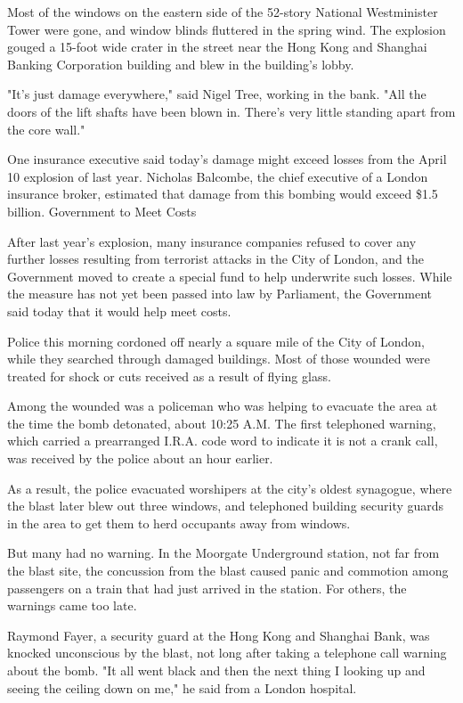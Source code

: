 Most of the windows on the eastern side of the 52-story National
Westminister Tower were gone, and window blinds fluttered in the spring
wind. The explosion gouged a 15-foot wide crater in the street near the
Hong Kong and Shanghai Banking Corporation building and blew in the
building's lobby.

"It's just damage everywhere," said Nigel Tree, working in the bank.
"All the doors of the lift shafts have been blown in. There's very
little standing apart from the core wall."

One insurance executive said today's damage might exceed losses from the
April 10 explosion of last year. Nicholas Balcombe, the chief executive
of a London insurance broker, estimated that damage from this bombing
would exceed \$1.5 billion. Government to Meet Costs

After last year's explosion, many insurance companies refused to cover
any further losses resulting from terrorist attacks in the City of
London, and the Government moved to create a special fund to help
underwrite such losses. While the measure has not yet been passed into
law by Parliament, the Government said today that it would help meet
costs.

Police this morning cordoned off nearly a square mile of the City of
London, while they searched through damaged buildings. Most of those
wounded were treated for shock or cuts received as a result of flying
glass.

Among the wounded was a policeman who was helping to evacuate the area
at the time the bomb detonated, about 10:25 A.M. The first telephoned
warning, which carried a prearranged I.R.A. code word to indicate it is
not a crank call, was received by the police about an hour earlier.

As a result, the police evacuated worshipers at the city's oldest
synagogue, where the blast later blew out three windows, and telephoned
building security guards in the area to get them to herd occupants away
from windows.

But many had no warning. In the Moorgate Underground station, not far
from the blast site, the concussion from the blast caused panic and
commotion among passengers on a train that had just arrived in the
station. For others, the warnings came too late.

Raymond Fayer, a security guard at the Hong Kong and Shanghai Bank, was
knocked unconscious by the blast, not long after taking a telephone call
warning about the bomb. "It all went black and then the next thing I
looking up and seeing the ceiling down on me," he said from a London
hospital.

